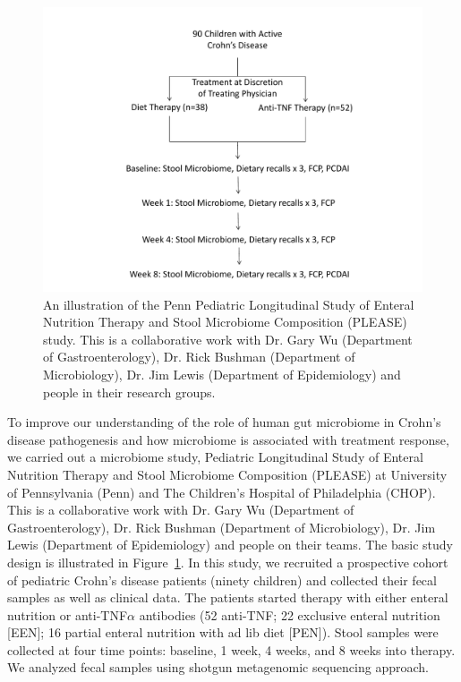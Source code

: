 \begin{figure}[p]
	\begin{center}
		\includegraphics[scale=0.60,trim=40 0 0 0,clip]{Figure/F12_PLEASE_Study.pdf}
		\caption[An illustration of the PLEASE study at University of Pennsylvania.]{An illustration of the Penn Pediatric Longitudinal Study of Enteral Nutrition Therapy and Stool Microbiome Composition (PLEASE) study. This is a collaborative work with Dr. Gary Wu (Department of Gastroenterology), Dr. Rick Bushman (Department of Microbiology), Dr. Jim Lewis (Department of Epidemiology) and people in their research groups. } \label{F12_PLEASE_Study}
	\end{center}
\end{figure}




To improve our understanding of the role of human gut microbiome in Crohn's disease pathogenesis and how microbiome is associated with treatment response, we carried out a microbiome study, Pediatric Longitudinal Study of Enteral Nutrition Therapy and Stool Microbiome Composition (PLEASE)  at University of Pennsylvania (Penn) and The Children's Hospital of Philadelphia (CHOP). This is a collaborative work with Dr. Gary Wu (Department of Gastroenterology), Dr. Rick Bushman (Department of Microbiology), Dr. Jim Lewis (Department of Epidemiology) and people on their teams. The basic study design is illustrated  in Figure~\ref{F12_PLEASE_Study}.  In this study, we recruited a prospective cohort of pediatric Crohn's disease patients (ninety children) and collected their fecal samples as well as clinical data. The patients started therapy with either enteral nutrition or anti-TNF$\alpha$ antibodies (52 anti-TNF; 22 exclusive enteral nutrition [EEN]; 16 partial enteral nutrition with ad lib diet [PEN]). Stool samples were collected at four time points: baseline, 1 week, 4 weeks, and 8 weeks into therapy. We analyzed fecal samples using shotgun metagenomic sequencing approach.


